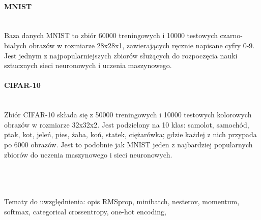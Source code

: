 \paragraph{MNIST} \mbox{}\\
Baza danych MNIST \cite{MNIST} to zbiór 60000 treningowych i 10000 testowych czarno-białych obrazów
w rozmiarze 28x28x1, zawierających ręcznie napisane cyfry 0-9. Jest jednym z
najpopularniejszych zbiorów służących do rozpoczęcia nauki sztucznych sieci neuronowych
i uczenia maszynowego.

\paragraph{CIFAR-10} \mbox{}\\
Zbiór CIFAR-10 \cite{CIFAR-10} składa się z 50000 treningowych i 10000 testowych kolorowych obrazów w rozmiarze
32x32x2. Jest podzielony na 10 klas: samolot, samochód, ptak, kot, jeleń, pies, żaba,
koń, statek, ciężarówka; gdzie każdej z nich przypada po 6000 obrazów. Jest to podobnie
jak MNIST jeden z najbardziej popularnych zbiorów do uczenia maszynowego i sieci neuronowych.

\\\\\\
Tematy do uwzględnienia:
opis RMSprop,
minibatch,
nesterov,
momentum,
softmax,
categorical crossentropy,
one-hot encoding,
